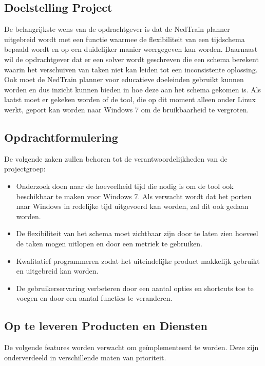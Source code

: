 \subsection{Doelstelling Project}
De belangrijkste wens van de opdrachtgever is dat de NedTrain planner uitgebreid wordt met een functie waarmee de flexibiliteit van een tijdschema bepaald wordt en op een duidelijker manier weergegeven kan worden. Daarnaast wil de opdrachtgever dat er een solver wordt geschreven die een schema berekent waarin het verschuiven van taken niet kan leiden tot een inconsistente oplossing. Ook moet de NedTrain planner voor educatieve doeleinden gebruikt kunnen worden en dus inzicht kunnen bieden in hoe deze aan het schema gekomen is. Als laatst moet er gekeken worden of de tool, die op dit moment alleen onder Linux werkt, geport kan worden naar Windows 7 om de bruikbaarheid te vergroten.

\subsection{Opdrachtformulering}
De volgende zaken zullen behoren tot de verantwoordelijkheden van de projectgroep:
\begin{itemize}
	\item Onderzoek doen naar de hoeveelheid tijd die nodig is om de tool ook beschikbaar te maken voor Windows 7. Als verwacht wordt dat het porten naar Windows in redelijke tijd uitgevoerd kan worden, zal dit ook gedaan worden. 
	\item De flexibiliteit van het schema moet zichtbaar zijn door te laten zien hoeveel de taken mogen uitlopen en door een metriek te gebruiken.
	\item Kwalitatief programmeren zodat het uiteindelijke product makkelijk gebruikt en uitgebreid kan worden.
	\item De gebruikerservaring verbeteren door een aantal opties en shortcuts toe te voegen en door een aantal functies te veranderen.
\end{itemize}

\subsection{Op te leveren Producten en Diensten}
\label{subsec:producten}
De volgende features worden verwacht om ge\"implementeerd te worden. Deze zijn onderverdeeld in verschillende maten van prioriteit. 

